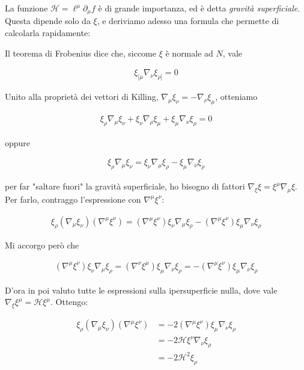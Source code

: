 \documentclass{report}
\begin{document}
La funzione \(\mathcal{H} = \ell^\mu \partial_\mu f\) è di grande importanza, ed è detta \emph{gravità superficiale}. Questa dipende solo da \(\xi\), e deriviamo adesso una formula che permette di calcolarla rapidamente: 

Il teorema di Frobenius dice che, siccome \(\xi\) è normale ad \(N\), vale 

\begin{align}
    \xi_{[\mu}\nabla_\nu \xi_{\rho]} = 0
\end{align}

Unito alla proprietà dei vettori di Killing, \(\nabla_\mu\xi_\nu = -\nabla_\nu\xi_\mu\), otteniamo 

\begin{align}
    \xi_\rho\nabla_\mu\xi_\nu + \xi_\nu\nabla_\rho\xi_\mu + \xi_\mu\nabla_\nu\xi_\rho = 0
\end{align}

oppure 

\begin{align}
    \xi_\rho \nabla_\mu\xi_\nu = \xi_\nu\nabla_\mu\xi_\rho - \xi_\mu\nabla_\nu \xi_\rho
\end{align}

per far "saltare fuori" la gravità superficiale, ho bisogno di fattori \(\nabla_\xi \xi = \xi^\mu \nabla_\mu \xi\). Per farlo, contraggo l'espressione con \(\nabla^\mu\xi^\nu\): 

\begin{align}
    \xi_\rho (\nabla_\mu\xi_\nu)(\nabla^\mu\xi^\nu) = (\nabla^\mu \xi^\nu)\xi_\nu \nabla_\mu \xi_\rho -  (\nabla^\mu\xi^\nu)\xi_\mu\nabla_\nu \xi_\rho
\end{align}

Mi accorgo però che 

\begin{align}
    (\nabla^\mu\xi^\nu)\xi_\nu \nabla_\mu \xi_\rho = (\nabla^\nu\xi^\mu)\xi_\mu \nabla_\nu \xi_\rho = - (\nabla^\mu\xi^\nu)\xi_\mu \nabla_\nu \xi_\rho
\end{align}

D'ora in poi valuto tutte le espressioni sulla ipersuperficie nulla, dove vale \(\nabla_\xi \xi^\mu = \mathcal{H}\xi^\mu\).  Ottengo:  

\begin{align}
    \xi_{\rho}(\nabla_\mu \xi_\nu)(\nabla^\mu \xi^\nu) &= -2 (\nabla^\mu \xi^\nu)\xi_\mu \nabla_\nu \xi_\rho \\
    &= -2\mathcal{H}\xi^\nu\nabla_\nu \xi_\rho \\
    &= -2\mathcal{H}^2 \xi_\rho 
\end{align}
\end{document}
